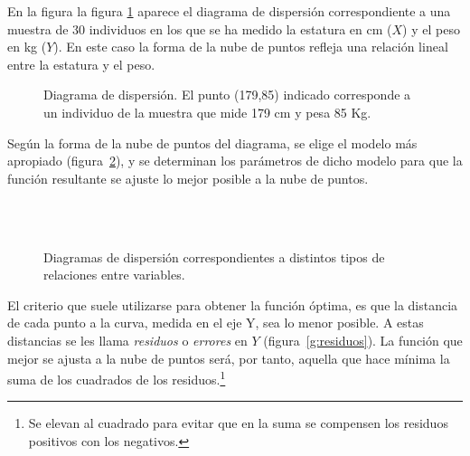 \begin{ejemplo}
En la figura la figura \ref{g:estatura-peso} aparece el diagrama de dispersión correspondiente a una muestra de 30
individuos en los que se ha medido la estatura en cm ($X$) y el peso en kg ($Y$).
En este caso la forma de la nube de puntos refleja una relación lineal entre la estatura y el peso.

\begin{figure}[h!]
\centering
\scalebox{0.75}{}
\caption{Diagrama de dispersión. El punto (179,85) indicado corresponde a un individuo de la muestra que mide 179 cm y
pesa 85 Kg.}
\label{g:estatura-peso}
\end{figure}
\end{ejemplo}

Según la forma de la nube de puntos del diagrama, se elige el modelo más apropiado (figura~\ref{g:tiposrelaciones}), y
se determinan los parámetros de dicho modelo para que la función resultante se ajuste lo mejor posible a la nube de
puntos.

\begin{figure}[h!]
\centering 
{}\qquad
{}\qquad
{}\\
\qquad
{}\qquad
{}\\
\caption{Diagramas de dispersión correspondientes a distintos tipos de relaciones
entre variables.} \label{g:tiposrelaciones}
\end{figure}

\clearpage

El criterio que suele utilizarse para obtener la función óptima, es que la distancia de cada punto a la curva, medida en
el eje Y, sea lo menor posible.
A estas distancias se les llama \emph{residuos} o \emph{errores} en $Y$ (figura~\ref{g:residuos}).
La función que mejor se ajusta a la nube de puntos será, por tanto, aquella que hace mínima la suma de los cuadrados de
los residuos.\footnote{Se elevan al cuadrado para evitar que en la suma se compensen los residuos positivos con los
negativos.}

